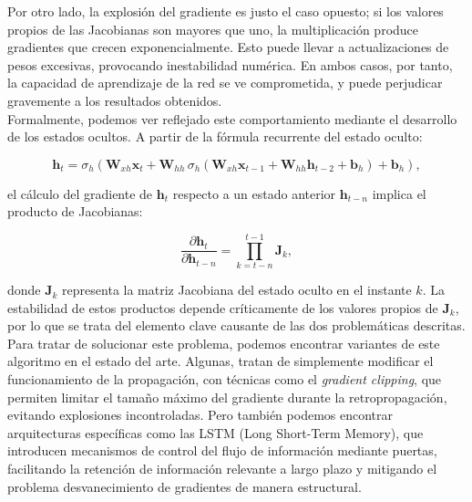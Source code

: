Por otro lado, la explosión del gradiente es justo el caso opuesto; si los valores propios de las Jacobianas son mayores que uno, la multiplicación produce gradientes que crecen exponencialmente. Esto puede llevar a actualizaciones de pesos excesivas, provocando inestabilidad numérica. En ambos casos, por tanto, la capacidad de aprendizaje de la red se ve comprometida, y puede perjudicar gravemente a los resultados obtenidos.\\

Formalmente, podemos ver reflejado este comportamiento mediante el desarrollo de los estados ocultos. A partir de la fórmula recurrente del estado oculto:

\begin{equation}
    \mathbf{h}_t = \sigma_h\left( \mathbf{W}_{xh} \mathbf{x}_t + \mathbf{W}_{hh} \, \sigma_h\left( \mathbf{W}_{xh} \mathbf{x}_{t-1} + \mathbf{W}_{hh} \mathbf{h}_{t-2} + \mathbf{b}_h \right) + \mathbf{b}_h \right),
    \label{eq:hidden_state_expansion}
\end{equation}

el cálculo del gradiente de \(\mathbf{h}_t\) respecto a un estado anterior \(\mathbf{h}_{t-n}\) implica el producto de Jacobianas:

\begin{equation}
    \frac{\partial \mathbf{h}_t}{\partial \mathbf{h}_{t-n}} = \prod_{k=t-n}^{t-1} \mathbf{J}_k,
    \label{eq:jacobian_product}
\end{equation}

donde \(\mathbf{J}_k\) representa la matriz Jacobiana del estado oculto en el instante \(k\). La estabilidad de estos productos depende críticamente de los valores propios de \(\mathbf{J}_k\), por lo que se trata del elemento clave causante de las dos problemáticas descritas.\\

Para tratar de solucionar este problema, podemos encontrar variantes de este algoritmo en el estado del arte. Algunas, tratan de simplemente modificar el funcionamiento de la propagación, con técnicas como el \textit{gradient clipping}, que permiten limitar el tamaño máximo del gradiente durante la retropropagación, evitando explosiones incontroladas. Pero también podemos encontrar arquitecturas específicas como las LSTM (Long Short-Term Memory), que introducen mecanismos de control del flujo de información mediante puertas, facilitando la retención de información relevante a largo plazo y mitigando el problema desvanecimiento de gradientes de manera estructural.

